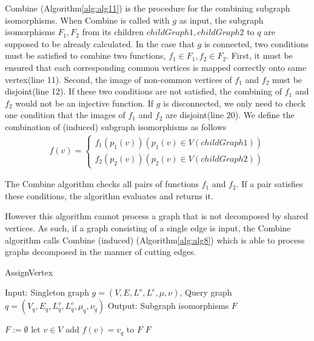 Combine (Algorithm\ref{alg:alg11}) is the procedure for the combining subgraph isomorphisms. When Combine is called with $g$ as input, the subgraph 
isomorphisms $F_1, F_2$ from its children $childGraph1, childGraph2$ to $q$ are supposed to be already calculated.
In the case that $g$ is connected, two conditions must be satisfied to combine two functions, $f_1 \in F_1, f_2 \in F_2$.
First, it must be ensured that each corresponding common vertices is mapped correctly onto same vertex(line 11).
Second, the image of non-common vertices of $f_1$ and $f_2$ must be disjoint(line 12).
If these two conditions are not satisfied, the combining of $f_1$ and $f_2$ would not be an injective function.
If $g$ is disconnected, we only need to check one condition that the images of $f_1$ and $f_2$ are disjoint(line 20).
We define the combination of (induced) subgraph isomorphisms as follows
\begin{eqnarray}
\label{eq:eq1}
f(v) = \left\{
\begin{array}{l}
f_1(p_1(v)) (p_1(v) \in V(childGraph1))\\
f_2(p_2(v)) (p_2(v) \in V(childGraph2))
\end{array}
\right.
\end{eqnarray}
 
The Combine algorithm checks all pairs of functions $f_1$ and $f_2$. If a pair satisfies these conditions, the algorithm evaluates and returns it.

However this algorithm cannot process a graph that is not decomposed by shared vertices. As such, if a graph consisting of a single edge
is input, the Combine algorithm calls Combine (induced) (Algorithm\ref{alg:alg8}) which is able to process graphs decomposed in the 
manner of cutting edges.

\begin{algorithm}
\caption{AssignVertex}
\label{alg:alg6}
\begin{algorithmic}
\STATE Input: Singleton graph $g=(V,E,L^v ,L^e ,\mu,\nu)$, Query graph $q=(V_q,E_q,L_q^v ,L_q^e ,\mu_q,\nu_q)$ 
\STATE Output: Subgraph isomorphisms $F$
\end{algorithmic}
\begin{algorithmic}[1]
\STATE $F := \emptyset$
\STATE let $v \in V$
		\STATE add $f(v) = v_q$ to $F$
	\ENDIF
\ENDFOR
\RETURN $F$
\end{algorithmic}
\end{algorithm}

